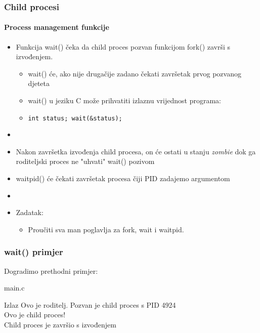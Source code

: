 \documentclass[table,usenames,dvipsnames]{beamer}
\newcommand{\shell}[1]{\texttt{#1}}
\begin{document}
\begin{frame}[t]
	\frametitle{Child procesi}
	\framesubtitle{Process management funkcije}
	\begin{itemize}
		\item Funkcija wait() čeka da child proces pozvan funkcijom fork() završi s izvođenjem.
		\begin{itemize}
			\item wait() će, ako nije drugačije zadano čekati završetak prvog pozvanog djeteta
			\item wait() u jeziku C može prihvatiti izlaznu vrijednost programa:
			\item[] \shell{int status; wait(\&status);}
		\end{itemize}
		\item[]
		\item Nakon završetka izvođenja child procesa, on će ostati u stanju \emph{zombie} dok ga roditeljski proces ne "uhvati" wait() pozivom
		\item waitpid() će čekati završetak procesa čiji PID zadajemo argumentom
		\item[]
		\item Zadatak:
		\begin{itemize}
			\item Proučiti sva man poglavlja za fork, wait i waitpid.
		\end{itemize}
	\end{itemize}
\end{frame}


\begin{frame}[t]
	\frametitle{wait() primjer}
	Dogradimo prethodni primjer:
	\begin{block}{main.c}
		\makeset
	\end{block}
	\begin{block}{Izlaz}{\small \ttfamily
		Ovo je roditelj. Pozvan je child proces s PID 4924\\
		Ovo je child proces!\\
		Child proces je završio s izvođenjem
	}\end{block}
\end{frame}
\end{document}
